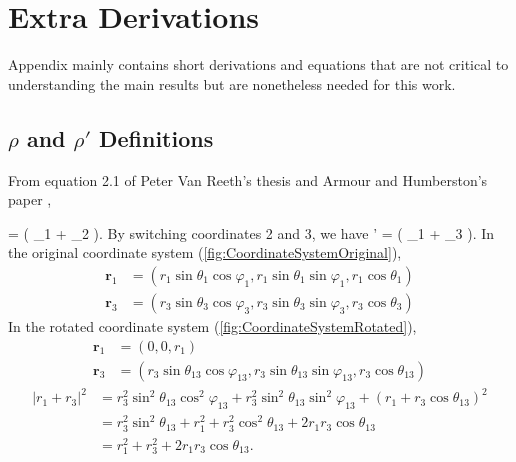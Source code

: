 \documentclass[Dissertation.tex]{subfiles}
\begin{document}
\chapter{Extra Derivations}
\label{chp:ExtraDer}

\iftoggle{UNT}{This}{\lettrine{\textcolor{startcolor}{T}}{his}}
Appendix mainly contains short derivations and equations that are not 
critical to understanding the main results but are nonetheless needed for 
this work.

\section{\texorpdfstring{$\rho$ and $\rho'$} {rho and rho'} Definitions}
\label{sec:RhoDef}
From equation 2.1 of Peter Van Reeth's thesis \cite{VanReethThesis} and Armour and Humberston's paper \cite{Armour1991},

\beq
\bm{\rho} =  \left( _1 + _2 \right).
\label{eq:RhoDef1}
\eeq
By switching coordinates 2 and 3, we have
\beq
\bm{\rho}' =  \left( _1 + _3 \right).
\label{eq:RhoDef2}
\eeq
In the original coordinate system (\cref{fig:CoordinateSystemOriginal}),
\begin{align}
\nonumber \bm{r}_1 &= \left( r_1 \sin \theta_1 \cos \varphi_1, r_1 \sin \theta_1 \sin \varphi_1, r_1 \cos \theta_1 \right) \\
\bm{r}_3 &= \left( r_3 \sin \theta_3 \cos \varphi_3, r_3 \sin \theta_3 \sin \varphi_3, r_3 \cos \theta_3 \right)
\end{align}
In the rotated coordinate system (\cref{fig:CoordinateSystemRotated}),
\begin{align}
\nonumber \bm{r}_1 &= (0, 0, r_1) \\
\bm{r}_3 &= \left( r_3 \sin \theta_{13} \cos \varphi_{13}, r_3 \sin \theta_{13} \sin \varphi_{13}, r_3 \cos \theta_{13} \right)
\end{align}
\begin{align}
\nonumber \left| r_1 + r_3 \right|^2 &= r_3^2 \sin^2 \theta_{13} \cos^2 \varphi_{13} + r_3^2 \sin^2 \theta_{13} \sin^2 \varphi_{13} + (r_1 + r_3 \cos \theta_{13})^2\\
\nonumber &= r_3^2 \sin^2 \theta_{13} + r_1^2 + r_3^2 \cos^2 \theta_{13} + 2 r_1 r_3 \cos \theta_{13} \\
&= r_1^2 + r_3^2 + 2 r_1 r_3 \cos \theta_{13}.
\label{eq:RhoDef3}
\end{align}
\end{document}
